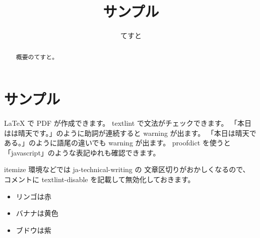 \documentclass[a4paper,10pt]{ltjsarticle}
\title{サンプル}
\author{てすと}
\begin{document}
\maketitle
\begin{abstract}
  概要のてすと。
\end{abstract}
\tableofcontents

\section{サンプル}

\LaTeX{} で PDF が作成できます。
textlint で文法がチェックできます。
「本日はは晴天です。」のように助詞が連続すると warning が出ます。
「本日は晴天である。」のように語尾の違いでも warning が出ます。
proofdict を使うと「javascript」のような表記ゆれも確認できます。

itemize 環境などでは ja-technical-writing の
文章区切りがおかしくなるので、
コメントに textlint-disable を記載して無効化しておきます。
\begin{itemize}
  \item リンゴは赤
  \item バナナは黄色
  \item ブドウは紫
\end{itemize}
\end{document}
